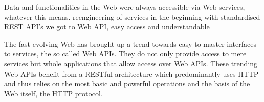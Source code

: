 


Data and functionalities in the Web were always accessible via Web services, whatever this means.
reengineering of services in the beginning
with standardised REST API's we got to Web API, easy access and understandable


The fast evolving Web has brought up a trend towards easy to master interfaces to services, the so called Web APIs.
They do not only provide access to mere services but whole applications that allow access over Web APIs.
These trending Web APIs benefit from a RESTful architecture which predominantly uses HTTP and thus relies on the most basic and powerful operations and the basis of the Web itself, the HTTP protocol. 

